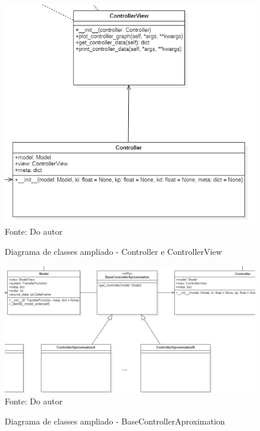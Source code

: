 \begin{figure}[H]
    \centering
    \caption{Diagrama de classes ampliado - Controller e ControllerView}
    \includegraphics[scale=0.7]{figuras/class_diag_controller}
    \label{fig:class_diag_controller}
    \\
    \vspace{0cm}\hspace{0cm}\small{Fonte: Do autor}
\end{figure}

\begin{figure}[H]
    \centering
    \caption{Diagrama de classes ampliado - BaseControllerAproximation}
    \includegraphics[scale=0.6]{figuras/class_diag_bcacontroller}
    \label{fig:class_diag_bcacontroller}
    \\
    \vspace{0cm}\hspace{0cm}\small{Fonte: Do autor}
\end{figure}

